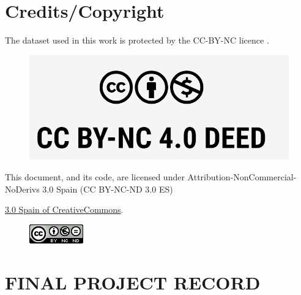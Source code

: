\setcounter{page}{1}
\pagestyle{plain}

\chapter*{Credits/Copyright}

The dataset used in this work is protected by the CC-BY-NC licence 
\cite{cc_by_nc_license}.

\begin{figure}[ht]
\centering
\includegraphics[scale=1]{images/CC BY-NC license.png}
\end{figure}

\vspace{1cm}

This document, and its code, are licensed under Attribution-NonCommercial-NoDerivs 3.0 Spain (CC BY-NC-ND 3.0 ES) 

\href{https://creativecommons.org/licenses/by-nc-nd/3.0/es/}{3.0 Spain of CreativeCommons}.


\begin{figure}[ht]
\centering
\includegraphics[scale=1]{images/license.png}
\end{figure}




\chapter*{FINAL PROJECT RECORD}

